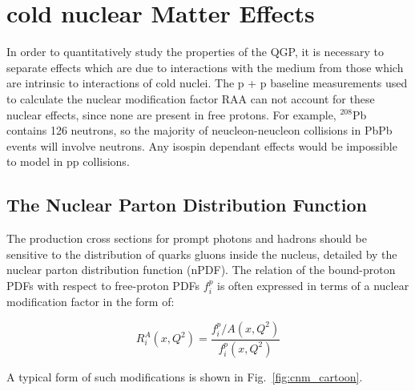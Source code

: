 \section{cold nuclear Matter Effects}
In order to quantitatively study the properties of the QGP, it is necessary to separate effects which are due to interactions with the medium from those which are intrinsic to interactions of cold nuclei. The p + p baseline measurements used to calculate the nuclear modification factor RAA can not account for these nuclear effects, since none are present in free protons. For example, $^{208}$Pb contains 126 neutrons, so the majority of neucleon-neucleon collisions in PbPb events will involve neutrons. Any isospin dependant effects would be impossible to model in pp collisions.

\subsection{The Nuclear Parton Distribution Function}
The production cross sections for prompt photons and hadrons should be sensitive to the distribution of quarks gluons inside the nucleus, detailed by the nuclear parton distribution function (nPDF). The relation of the bound-proton PDFs with respect to free-proton PDFs $f_i^p$ is often expressed in terms of a nuclear modification factor in the form of:

  \begin{equation}
    R_i^A(x,Q^2) = \frac{f_i^p/A(x,Q^2)}{f_i^p(x,Q^2)} 
  \end{equation}

  A typical form of such modifications is shown in Fig.~\ref{fig:cnm_cartoon}.

